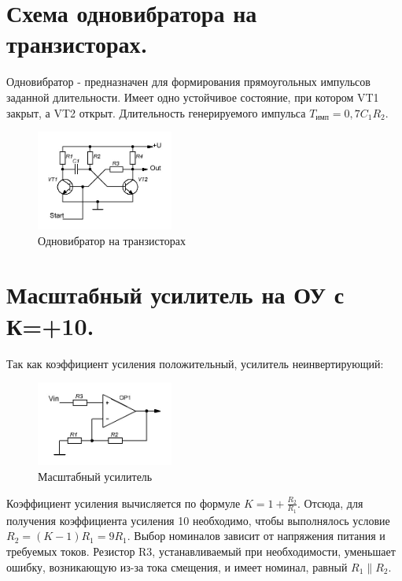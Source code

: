\documentclass[unicode, 12pt, a4paper, oneside]{article}
\begin{document}
\section{Схема одновибратора на транзисторах.}

Одновибратор - предназначен для формирования прямоугольных импульсов заданной длительности. Имеет одно устойчивое состояние, при котором VT1 закрыт, а VT2 открыт. Длительность генерируемого импульса $T_\text{имп} = 0,7 C_1 R_2 $.

\begin{figure}[H]
\centering
\includegraphics[width=0.4\textwidth]{142.jpg}
\caption{Одновибратор на транзисторах}
\end{figure}

\section{Масштабный усилитель на ОУ с К=+10.}

Так как коэффициент усиления положительный, усилитель неинвертирующий:
\begin{figure}[H]
\centering
\includegraphics[width=0.4\textwidth]{143.jpg}
\caption{Масштабный усилитель}
\end{figure}
Коэффициент усиления вычисляется по формуле $K = 1 + \frac{R_2}{R_1} $. Отсюда, для получения коэффициента усиления 10 необходимо, чтобы выполнялось условие $R_2 = (K - 1) R_1 = 9 R_1$. Выбор номиналов зависит от напряжения питания и требуемых токов. Резистор R3, устанавливаемый при необходимости, уменьшает ошибку, возникающую из-за тока смещения, и имеет номинал, равный $R_1 \parallel R_2$.

\end{document}
